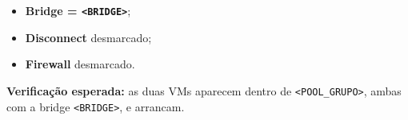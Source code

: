 \begin{itemize}
\item \textbf{Bridge = \texttt{\textless{}BRIDGE\textgreater{}}};
\item \textbf{Disconnect} desmarcado;
\item \textbf{Firewall} desmarcado.
\end{itemize}


\textbf{Verificação esperada:} as duas VMs aparecem dentro de \texttt{\textless{}POOL\_GRUPO\textgreater{}}, ambas com a bridge \texttt{\textless{}BRIDGE\textgreater{}}, e arrancam.
